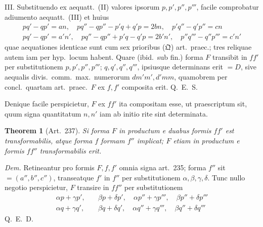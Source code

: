 \documentclass[12pt,a4paper]{article}
\theoremstyle{plain}
\newtheorem{theorem}{Theorem}[section]
\theoremstyle{definition}
\theoremstyle{remark}
\theoremstyle{problemstyle}
\begin{document}
III. Substituendo ex aequatt.\ (II) valores ipsorum $p, p', p'', p'''$, facile comprobatur adiumento aequatt.\ (III) et huius
\begin{gather*}
pq' - qp' = an, \quad pq'' - qp'' - p'q + q'p = 2bn, \quad p'q'' - q'p'' = cn \\
pq' - qp' = a'n', \quad pq'' - qp'' + p'q - q'p = 2b'n', \quad p''q''' - q''p''' = c'n'
\end{gather*}
quae aequationes identicae sunt cum sex prioribus ($\mathfrak{Q}$) art.\ praec.; tres reliquae autem iam per hyp.\ locum habent. Quare (ibid.\ sub fin.) forma $F$ transibit in $ff'$ per substitutionem $p, p', p'', p'''$; $q, q', q'', q'''$, ipsiusque determinans erit $= D$, sive aequalis divis.\ comm.\ max.\ numerorum $dm'm', d'mm$, quamobrem per concl.\ quartam art.\ praec.\ $F$ ex $f, f'$ composita erit. Q.\ E.\ S.

Denique facile perspicietur, $F$ ex $ff'$ ita compositam esse, ut praescriptum sit, quum signa quantitatum $n, n'$ iam ab initio rite sint determinata.


\begin{theorem}[Art.\ 237]
Si forma $F$ in productum e duabus formis $ff'$ est transformabilis, atque forma $f$ formam $f''$ implicat; $F$ etiam in productum e formis $ff''$ transformabilis erit.
\end{theorem}

\emph{Dem.} Retineantur pro formis $F, f, f'$ omnia signa art.\ 235; forma $f''$ sit $= (a'', b'', c'')$, transeatque $f'$ in $f''$ per substitutionem $\alpha, \beta, \gamma, \delta$. Tunc nullo negotio perspicietur, $F$ transire in $ff''$ per substitutionem
\begin{align*}
\alpha p + \gamma p', &\quad \beta p + \delta p', \quad \alpha p'' + \gamma p''', \quad \beta p'' + \delta p''' \\
\alpha q + \gamma q', &\quad \beta q + \delta q', \quad \alpha q'' + \gamma q''', \quad \beta q'' + \delta q'''
\end{align*}
Q.\ E.\ D.
\end{document}
